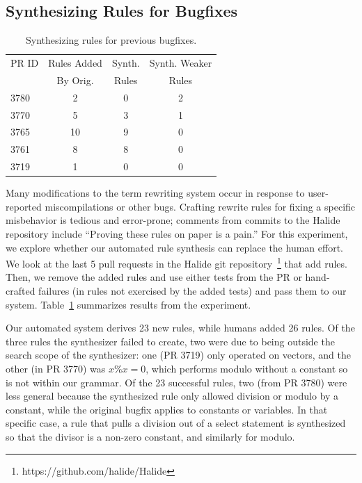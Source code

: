 \documentclass[sigplan,10pt,review,anonymous]{acmart}\settopmatter{printfolios=true,printccs=false,printacmref=false}
\begin{document}


\subsection{Synthesizing Rules for Bugfixes}
\begin{table}
  \caption{Synthesizing rules for previous bugfixes.}
  \label{tab:prbugfixes}
  \begin{tabular}{lccc}
    PR ID & Rules Added & Synth. & Synth. Weaker\\
          & By Orig.    & Rules  & Rules\\\hline
    3780 & 2 & 0 & 2\\
    3770 & 5 & 3 & 1\\
    3765 & 10 & 9 & 0\\
    3761 & 8 & 8 & 0\\
    3719 & 1 & 0 & 0\\
  \end{tabular}
\end{table}
Many modifications to the term rewriting system occur in response to user-reported
miscompilations or other bugs.  Crafting rewrite rules for fixing a specific misbehavior
is tedious and error-prone; comments from commits to the Halide repository include
``Proving these rules on paper is a pain.''  For this experiment, we explore whether
our automated rule synthesis can replace the human effort.  We look at the last 5 pull
requests in the Halide git repository~\footnote{https://github.com/halide/Halide} that add rules.  Then, we remove
the added rules and use either tests from the PR or hand-crafted failures (in rules
not exercised by the added tests) and pass them to our system.
Table~\ref{tab:prbugfixes} summarizes results from the experiment.

Our automated system derives 23 new rules, while humans added 26 rules.  Of the three
rules the synthesizer failed to create, two were due to being outside the search scope
of the synthesizer: one (PR 3719) only operated on vectors, and the other (in PR 3770) was $x \% x = 0$, which
performs modulo without a constant so is not within our grammar.  Of the 23 successful
rules, two (from PR 3780) were less general because the synthesized rule only allowed division
or modulo by a constant, while the original bugfix applies to constants or variables.
In that specific case, a rule that pulls a division out of a select statement
is synthesized so that the divisor is a non-zero constant, and similarly for modulo.
\end{document}
